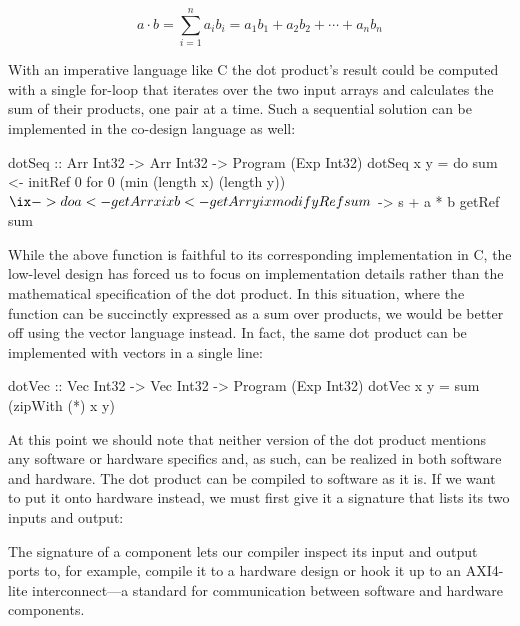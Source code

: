 \documentclass[../paper.tex]{subfiles}
\begin{document}
\begin{equation}
a \cdot b = \sum_{i=1}^{n}a_{i}b_{i} = a_{1}b_{1} + a_{2}b_{2} + \cdots + a_{n}b_{n}
\end{equation}

With an imperative language like C the dot product's result could be computed with a single for-loop that iterates over the two input arrays and calculates the sum of their products, one pair at a time. Such a sequential solution can be implemented in the co-design language as well:

\begin{code}
dotSeq :: Arr Int32 -> Arr Int32 -> Program (Exp Int32)
dotSeq x y = do
  sum <- initRef 0
  for 0 (min (length x) (length y)) $ \ix -> do
    a <- getArr x ix
    b <- getArr y ix
    modifyRef sum $ \s -> s + a * b
  getRef sum
\end{code}

While the above function is faithful to its corresponding implementation in C, the low-level design has forced us to focus on implementation details rather than the mathematical specification of the dot product. In this situation, where the function can be succinctly expressed as a sum over products, we would be better off using the vector language instead. In fact, the same dot product can be implemented with vectors in a single line:

\begin{code}
dotVec :: Vec Int32 -> Vec Int32 -> Program (Exp Int32)
dotVec x y = sum (zipWith (*) x y)
\end{code}

At this point we should note that neither version of the dot product mentions any software or hardware specifics and, as such, can be realized in both software and hardware. The dot product can be compiled to software as it is. If we want to put it onto hardware instead, we must first give it a signature that lists its two inputs and output:


\noindent The signature of a component lets our compiler inspect its input and output ports to, for example, compile it to a hardware design or hook it up to an AXI4-lite interconnect---a standard for communication between software and hardware components.
\end{document}
